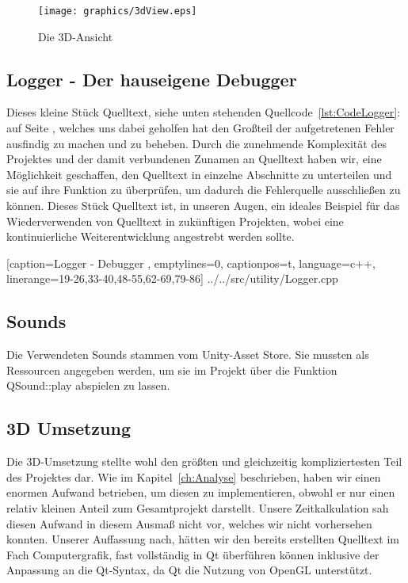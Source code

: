 \documentclass[a4paper]{scrartcl}
\begin{document}
\begin{figure}[H]
 \centering
 \texttt{[image: graphics/3dView.eps]}
 \caption{Die 3D-Ansicht}
 \label{fig:3dVuew}
\end{figure} 

\subsection{Logger - Der hauseigene Debugger}\label{ch:Logger}
Dieses kleine Stück Quelltext, siehe unten stehenden Quellcode~\ref{lst:CodeLogger}: auf Seite \pageref{lst:CodeLogger}, welches uns dabei geholfen hat den Großteil der aufgetretenen Fehler ausfindig zu machen und zu beheben. Durch die zunehmende Komplexität des Projektes und der damit verbundenen Zunamen an Quelltext haben wir, eine Möglichkeit geschaffen, den Quelltext in einzelne Abschnitte zu unterteilen und sie auf ihre Funktion zu überprüfen, um dadurch die Fehlerquelle ausschließen zu können. Dieses Stück Quelltext ist, in unseren Augen, ein ideales Beispiel für das Wiederverwenden von Quelltext in zukünftigen Projekten, wobei eine kontinuierliche Weiterentwicklung angestrebt werden sollte.

    [caption={Logger - Debugger} 	%
    	\label{lst:CodeLogger},			%
    emptylines=0,					%
    captionpos=t,					%
    language=c++,					%
    linerange={19-26,33-40,48-55,62-69,79-86}]%
{../../src/utility/Logger.cpp}		%

\subsection{Sounds}\label{ch:Sounds}
Die Verwendeten Sounds stammen vom Unity-Asset Store. Sie mussten als Ressourcen angegeben werden, um sie im Projekt über die Funktion QSound::play abspielen zu lassen.

\subsection{3D Umsetzung}\label{ch:3DUmsetzung}
Die 3D-Umsetzung stellte wohl den größten und gleichzeitig kompliziertesten Teil des Projektes dar. Wie im Kapitel~\ref{ch:Analyse} beschrieben, haben wir einen enormen Aufwand betrieben, um diesen zu implementieren, obwohl er nur einen relativ kleinen Anteil zum Gesamtprojekt darstellt. Unsere Zeitkalkulation sah diesen Aufwand in diesem Ausmaß nicht vor, welches wir nicht vorhersehen konnten. Unserer Auffassung nach, hätten wir den bereits erstellten Quelltext im Fach Computergrafik, fast vollständig in Qt überführen können inklusive der Anpassung an die Qt-Syntax, da Qt die Nutzung von OpenGL unterstützt. 
\end{document}
